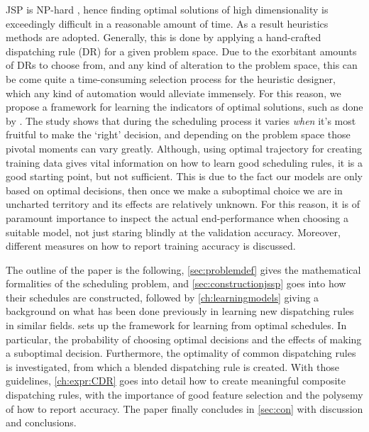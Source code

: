 \documentclass[smallextended]{svjour3}
\begin{document}
JSP is NP-hard \cite{Garey76:NPhard}, hence finding optimal solutions of high 
dimensionality is exceedingly difficult in a reasonable amount of time. As a 
result heuristics methods are adopted. Generally, this is done by applying a 
hand-crafted dispatching rule (DR) for a given problem space. Due to the 
exorbitant amounts of DRs to choose from, and any kind of alteration to the 
problem space, this can be come quite a time-consuming selection process for 
the heuristic designer, which any kind of automation would alleviate immensely. 
For this reason, we propose a framework for learning the indicators of optimal 
solutions, such as done by \cite{Siggi10}.  The study shows that during the 
scheduling process it varies \emph{when} it's most fruitful to make the `right' 
decision, and depending on the problem space those pivotal moments can vary 
greatly. 
Although, using optimal trajectory for creating training data gives vital 
information on how to learn good scheduling rules, it is a good starting point, 
but not sufficient. This is due to the fact our models are only based on 
optimal decisions, then once we make a suboptimal choice we are in uncharted 
territory and its effects are relatively unknown. For this reason, it is of 
paramount importance to inspect the actual end-performance when choosing a 
suitable model, not just staring blindly at the validation accuracy. Moreover, 
different measures on how to report training accuracy is discussed.

The outline of the paper is the following, \cref{sec:problemdef} gives the 
mathematical formalities of the scheduling problem, and  
\cref{sec:constructionjssp} goes into how their schedules are constructed, 
followed by \cref{ch:learningmodels} giving a background on what has been done 
previously in learning new dispatching rules in similar fields.  
sets up the framework for learning from optimal schedules. In particular, the 
probability of choosing optimal decisions and the effects of making a 
suboptimal decision. Furthermore, the optimality of common dispatching rules is 
investigated, from which a blended dispatching rule is created. With those 
guidelines, \cref{ch:expr:CDR} goes into detail how to create meaningful 
composite dispatching rules, with the importance of good feature selection and 
the polysemy of how to report accuracy. The paper finally concludes in 
\cref{sec:con} with discussion and conclusions.
\end{document}

